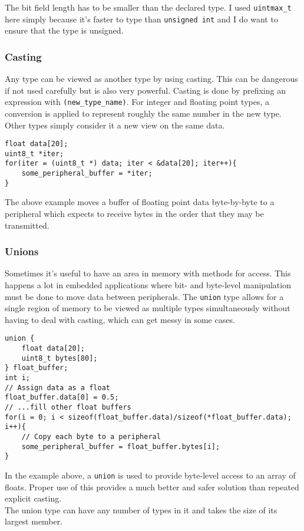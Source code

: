 \documentclass[10pt]{article}
\begin{document}
The bit field length has to be smaller than the declared type. I used \texttt{uintmax\_t} here simply because it's faster to type than \texttt{unsigned int} and I do want to ensure that the type is unsigned. \\

\subsubsection{Casting}

Any type can be viewed as another type by using casting. This can be dangerous if not used carefully but is also very powerful. Casting is done by prefixing an expression with \texttt{(new\_type\_name)}. For integer and floating point types, a conversion is applied to represent roughly the same number in the new type. Other types simply consider it a new view on the same data.
\begin{lstlisting}[label=lst-casting-iter,caption=Casting for byte-wise iteration]
float data[20];
uint8_t *iter;
for(iter = (uint8_t *) data; iter < &data[20]; iter++){
	some_peripheral_buffer = *iter;
}
\end{lstlisting}
The above example moves a buffer of floating point data byte-by-byte to a peripheral which expects to receive bytes in the order that they may be transmitted. 


\subsubsection{Unions} \label{sec:unions}

Sometimes it's useful to have an area in memory with methods for access. This happens a lot in embedded applications where bit- and byte-level manipulation must be done to move data between peripherals. The \texttt{union} type allows for a single region of memory to be viewed as multiple types simultaneously without having to deal with casting, which can get messy in some cases.
\begin{lstlisting}[label=lst-union-iter,caption=Unions for byte-wise iteration]
union {
	float data[20];
	uint8_t bytes[80];
} float_buffer;
int i;
// Assign data as a float
float_buffer.data[0] = 0.5;
// ...fill other float buffers
for(i = 0; i < sizeof(float_buffer.data)/sizeof(*float_buffer.data); i++){
	// Copy each byte to a peripheral
	some_peripheral_buffer = float_buffer.bytes[i];
}
\end{lstlisting}
In the example above, a \texttt{union} is used to provide byte-level access to an array of floats. Proper use of this provides a much better and safer solution than repeated explicit casting.  \\
The union type can have any number of types in it and takes the size of its largest member.
\end{document}
